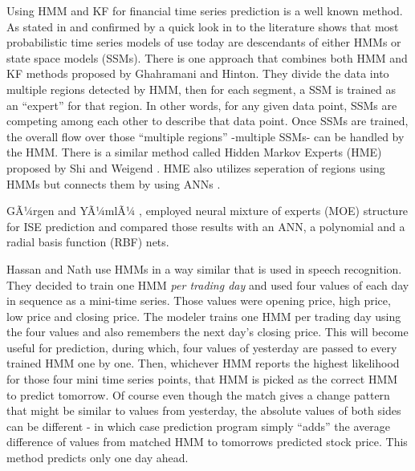 Using HMM and KF for financial time series prediction is a well known method. As
stated in \cite{ghahramani3} and confirmed by a quick look in to the literature
shows that most probabilistic time series models of use today are descendants of
either HMMs or state space models (SSMs). There is one approach that combines
both HMM and KF methods proposed by Ghahramani and Hinton. They divide the data
into multiple regions detected by HMM, then for each segment, a SSM is trained
as an ``expert'' for that region. In other words, for any given data point, SSMs
are competing among each other to describe that data point. Once SSMs are
trained, the overall flow over those ``multiple regions'' -multiple SSMs- can be
handled by the HMM. There is a similar method called Hidden Markov Experts (HME)
proposed by Shi and Weigend \cite{shi}. HME also utilizes seperation of regions
using HMMs but connects them by using ANNs \cite{nabney}.

GÃ¼rgen and YÃ¼mlÃ¼ \cite{gurgen}, employed neural mixture of experts (MOE)
structure for ISE prediction and compared those results with an ANN, a
polynomial and a radial basis function (RBF) nets.

Hassan and Nath \cite{hassan} use HMMs in a way similar that is used in speech
recognition. They decided to train one HMM {\em per trading day} and used four
values of each day in sequence as a mini-time series. Those values were opening
price, high price, low price and closing price. The modeler trains one HMM per
trading day using the four values and also remembers the next day's closing
price. This will become useful for prediction, during which, four values of
yesterday are passed to every trained HMM one by one. Then, whichever HMM
reports the highest likelihood for those four mini time series points, that HMM
is picked as the correct HMM to predict tomorrow. Of course even though the
match gives a change pattern that might be similar to values from yesterday, the
absolute values of both sides can be different - in which case prediction
program simply ``adds'' the average difference of values from matched HMM to
tomorrows predicted stock price. This method \cite{hassan} predicts only one day
ahead.

